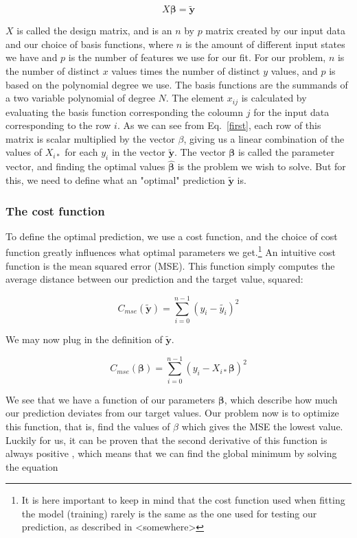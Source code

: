 \documentclass[twocolumn,10pt,cleanfoot]{asme2ej}
\begin{document}
\begin{equation}
X \bm{\beta} = \bm{\tilde{y}}
\label{first}
\end{equation}


$X$ is called the design matrix, and is an $n$ by $p$ matrix created by our input data and our choice of basis functions, where $n$ is the amount of different input states we have and $p$ is the number of features we use for our fit. For our problem, $n$ is the number of distinct $x$ values times the number of distinct $y$ values, and $p$ is based on the polynomial degree we use. The basis functions are the summands of a two variable polynomial of degree $N$. The element $x_{ij}$ is calculated by evaluating the basis function corresponding the coloumn $j$ for the input data corresponding to the row $i$. As we can see from Eq.~\ref{first}, each row of this matrix is scalar multiplied by the vector $\beta$, giving us a linear combination of the values of $X_{i*}$ for each $y_i$ in the vector $\bm{\tilde{y}}$. The vector $\bm{\beta}$ is called the parameter vector, and finding the optimal values $\hat{\bm{\beta}}$ is the problem we wish to solve. But for this, we need to define what an "optimal" prediction $\bm{\tilde{y}}$ is.

\subsubsection{The cost function}

To define the optimal prediction, we use a cost function, and the choice of cost function greatly influences what optimal parameters we get.\footnote{It is here important to keep in mind that the cost function used when fitting the model (training) rarely is the same as the one used for testing our prediction, as described in <somewhere>} An intuitive cost function is the mean squared error (MSE). This function simply computes the average distance between our prediction and the target value, squared:

\begin{equation}
	C_{mse}(\tilde{\bm{y}}) = \sum_{i=0}^{n-1}(y_i-\tilde{y_i})^2
\end{equation}

We may now plug in the definition of $\bm{\tilde{y}}$.

\begin{equation}
	C_{mse}(\bm{\beta}) = \sum_{i=0}^{n-1}(y_i-X_{i*}\bm{\beta})^2
\end{equation}

We see that we have a function of our parameters $\bm{\beta}$, which describe how much our prediction deviates from our target values. Our problem now is to optimize this function, that is, find the values of $\beta$ which gives the MSE the lowest value. Luckily for us, it can be proven that the second derivative of this function is always positive \cite[106]{linreg}, which means that we can find the global minimum by solving the equation
\end{document}
